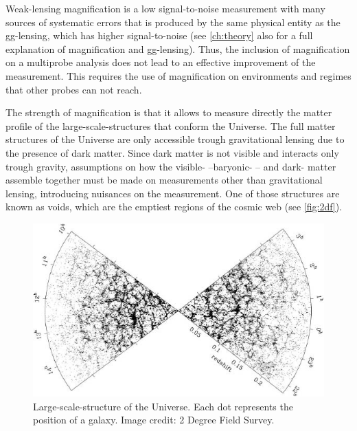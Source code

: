 Weak-lensing magnification is a low signal-to-noise measurement with many sources of systematic errors \cite{2016MNRAS.455.3943H} that is produced by the same physical entity as the gg-lensing, which has higher signal-to-noise (see \autoref{ch:theory} also for a full explanation of magnification and gg-lensing). Thus, the inclusion of magnification on a multiprobe analysis does not lead to an effective improvement of the measurement. This requires the use of magnification on environments and regimes that other probes can not reach.
\newline

The strength of magnification is that it allows to measure directly the matter profile of the large-scale-structures that conform the Universe. The full matter structures of the Universe are only accessible trough gravitational lensing due to the presence of dark matter. Since dark matter is not visible and interacts only trough gravity, assumptions on how the visible- --baryonic- -- and dark- matter assemble together must be made on measurements other than gravitational lensing, introducing nuisances on the measurement. One of those structures are known as voids, which are the emptiest regions of the cosmic web (see \autoref{fig:2df}).
\begin{figure}
\includegraphics[width=\textwidth]{./Pictures/2df.jpg}
\caption{Large-scale-structure of the Universe. Each dot represents the position of a galaxy. Image credit: 2 Degree Field Survey.}
\label{fig:2df}
\end{figure}
\newline

